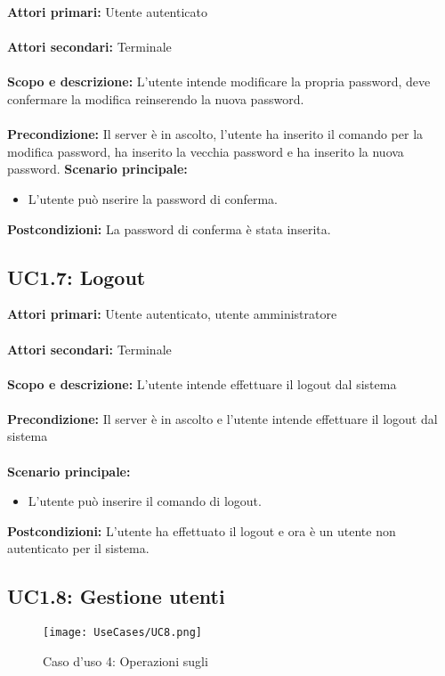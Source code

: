 \documentclass{scalatekids-article}
\begin{document}
\textbf{Attori primari:} Utente autenticato\\ \\
\textbf{Attori secondari:} Terminale\\ \\
\textbf{Scopo e descrizione:} L'utente intende modificare la propria password, deve confermare la modifica reinserendo la nuova password.\\ \\
\textbf{Precondizione:} Il server è in ascolto, l'utente ha inserito il comando per la modifica password, ha inserito la vecchia password e ha inserito la nuova password.
\textbf{Scenario principale:}
\begin{itemize}
  \item L'utente può nserire la password di conferma.
\end{itemize}
\textbf{Postcondizioni:} La password di conferma è stata inserita.

\subsection{UC1.7: Logout}

\textbf{Attori primari:} Utente autenticato, utente amministratore\\ \\
\textbf{Attori secondari:} Terminale\\ \\
\textbf{Scopo e descrizione:} L'utente intende effettuare il logout dal sistema\\ \\
\textbf{Precondizione:} Il server è in ascolto e l'utente intende effettuare il logout dal sistema\\ \\
\textbf{Scenario principale:}
\begin{itemize}
  \item L'utente può inserire il comando di logout.
\end{itemize}
\textbf{Postcondizioni:} L'utente ha effettuato il logout e ora è un utente non autenticato per il sistema.

\subsection{UC1.8: Gestione utenti}

\begin{figure}[H]
  \begin{center}
    \texttt{[image: UseCases/UC8.png]}
    \caption*{Caso d'uso 4: Operazioni sugli }
  \end{center}
\end{figure}
\end{document}
